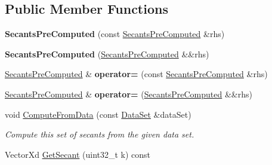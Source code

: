 \subsection*{Public Member Functions}
\begin{DoxyCompactItemize}
\item 
\hypertarget{struct_d_r_d_s_p_1_1_secants_pre_computed_a11e28de45102b068cf71cb2c9d6fca68}{{\bfseries Secants\-Pre\-Computed} (const \hyperlink{struct_d_r_d_s_p_1_1_secants_pre_computed}{Secants\-Pre\-Computed} \&rhs)}\label{struct_d_r_d_s_p_1_1_secants_pre_computed_a11e28de45102b068cf71cb2c9d6fca68}

\item 
\hypertarget{struct_d_r_d_s_p_1_1_secants_pre_computed_a9a23b0c9136fe8990a00be33787cb0f5}{{\bfseries Secants\-Pre\-Computed} (\hyperlink{struct_d_r_d_s_p_1_1_secants_pre_computed}{Secants\-Pre\-Computed} \&\&rhs)}\label{struct_d_r_d_s_p_1_1_secants_pre_computed_a9a23b0c9136fe8990a00be33787cb0f5}

\item 
\hypertarget{struct_d_r_d_s_p_1_1_secants_pre_computed_a7ca923d368f7131f8628eaf2bcf0d715}{\hyperlink{struct_d_r_d_s_p_1_1_secants_pre_computed}{Secants\-Pre\-Computed} \& {\bfseries operator=} (const \hyperlink{struct_d_r_d_s_p_1_1_secants_pre_computed}{Secants\-Pre\-Computed} \&rhs)}\label{struct_d_r_d_s_p_1_1_secants_pre_computed_a7ca923d368f7131f8628eaf2bcf0d715}

\item 
\hypertarget{struct_d_r_d_s_p_1_1_secants_pre_computed_afd36138af8143a3daa493d988938e784}{\hyperlink{struct_d_r_d_s_p_1_1_secants_pre_computed}{Secants\-Pre\-Computed} \& {\bfseries operator=} (\hyperlink{struct_d_r_d_s_p_1_1_secants_pre_computed}{Secants\-Pre\-Computed} \&\&rhs)}\label{struct_d_r_d_s_p_1_1_secants_pre_computed_afd36138af8143a3daa493d988938e784}

\item 
\hypertarget{struct_d_r_d_s_p_1_1_secants_pre_computed_a07644fb406546e3e6f5adbebd472a968}{void \hyperlink{struct_d_r_d_s_p_1_1_secants_pre_computed_a07644fb406546e3e6f5adbebd472a968}{Compute\-From\-Data} (const \hyperlink{struct_d_r_d_s_p_1_1_data_set}{Data\-Set} \&data\-Set)}\label{struct_d_r_d_s_p_1_1_secants_pre_computed_a07644fb406546e3e6f5adbebd472a968}

\begin{DoxyCompactList}\small\item\em Compute this set of secants from the given data set. \end{DoxyCompactList}\item 
\hypertarget{struct_d_r_d_s_p_1_1_secants_pre_computed_a6b9de4610d5af4f02ab7b0c6fc326ed8}{Vector\-Xd \hyperlink{struct_d_r_d_s_p_1_1_secants_pre_computed_a6b9de4610d5af4f02ab7b0c6fc326ed8}{Get\-Secant} (uint32\-\_\-t k) const }\label{struct_d_r_d_s_p_1_1_secants_pre_computed_a6b9de4610d5af4f02ab7b0c6fc326ed8}


\end{DoxyCompactItemize}

